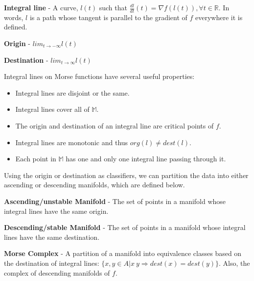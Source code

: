 \begin{defn}
  \textbf{Integral line} - A curve, $l(t)$ such that $\frac{d l}{d t}(t) = \nabla f(l(t)), \forall t \in \mathbb{R}$. In words, $l$ is a path whose tangent is parallel to the gradient of $f$ everywhere it is defined.
\end{defn}

\begin{defn}
  \textbf{Origin} - $lim_{t\rightarrow -\infty}l(t)$
\end{defn}

\begin{defn}
  \textbf{Destination} - $lim_{t\rightarrow \infty}l(t)$
\end{defn}

Integral lines on Morse functions have several useful properties:

\begin{itemize}
\item Integral lines are disjoint or the same.
\item Integral lines cover all of $\mathbb{M}$.
\item The origin and destination of an integral line are critical points of $f$.
\item Integral lines are monotonic and thus $org(l) \neq dest(l)$.
\item Each point in $\mathbb{M}$ has one and only one integral line passing through it.
\end{itemize}

Using the origin or destination as classifiers, we can partition the data into either ascending or descending manifolds, which are defined below.

\begin{defn}
  \textbf{Ascending/unstable Manifold} - The set of points in a manifold whose integral lines have the same origin.
\end{defn}

\begin{defn}
  \textbf{Descending/stable Manifold} - The set of points in a manifold whose integral lines have the same destination.
\end{defn}


\begin{defn}
 \textbf{Morse Complex} - A partition of a manifold into equivalence classes based on the destination of integral lines: $\{x,y \in A | x~y \Rightarrow dest(x) = dest(y)\}$. Also, the complex of descending manifolds of $f$.
\end{defn}

